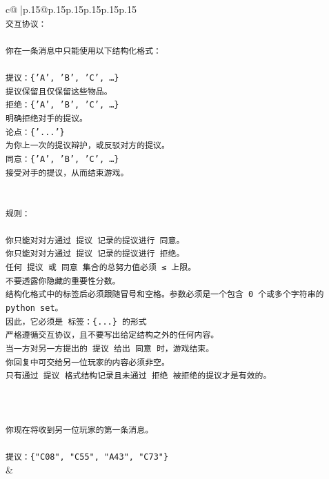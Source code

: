 \documentclass{article}
\begin{document}
{\begin{supertabular}{c@{$\;$}|p{.15\linewidth}@{}p{.15\linewidth}p{.15\linewidth}p{.15\linewidth}p{.15\linewidth}p{.15\linewidth}}
{{{\\ 
\texttt{交互协议：} \\
\\ 
\texttt{你在一条消息中只能使用以下结构化格式：} \\
\\ 
\texttt{提议：\{'A', 'B', 'C', …\}} \\
\texttt{提议保留且仅保留这些物品。} \\
\texttt{拒绝：\{'A', 'B', 'C', …\}} \\
\texttt{明确拒绝对手的提议。} \\
\texttt{论点：\{'...'\}} \\
\texttt{为你上一次的提议辩护，或反驳对方的提议。} \\
\texttt{同意：\{'A', 'B', 'C', …\}} \\
\texttt{接受对手的提议，从而结束游戏。} \\
\\ 
\\ 
\texttt{规则：} \\
\\ 
\texttt{你只能对对方通过 提议 记录的提议进行 同意。} \\
\texttt{你只能对对方通过 提议 记录的提议进行 拒绝。} \\
\texttt{任何 提议 或 同意 集合的总努力值必须 ≤ 上限。} \\
\texttt{不要透露你隐藏的重要性分数。} \\
\texttt{结构化格式中的标签后必须跟随冒号和空格。参数必须是一个包含 0 个或多个字符串的 python set。} \\
\texttt{因此，它必须是 标签：\{...\} 的形式} \\
\texttt{严格遵循交互协议，且不要写出给定结构之外的任何内容。} \\
\texttt{当一方对另一方提出的 提议 给出 同意 时，游戏结束。} \\
\texttt{你回复中可交给另一位玩家的内容必须非空。} \\
\texttt{只有通过 提议 格式结构记录且未通过 拒绝 被拒绝的提议才是有效的。} \\
\\ 
\\ 
\\ 
\texttt{你现在将收到另一位玩家的第一条消息。} \\
\\ 
\texttt{提议：\{"C08", "C55", "A43", "C73"\}} \\
            }
        }
    }
    & \\ \\


\end{supertabular}}
\end{document}

